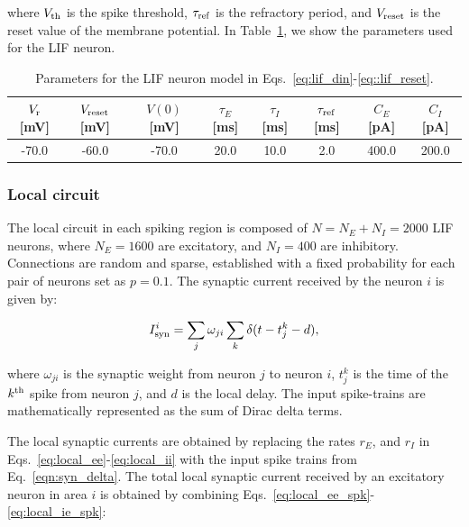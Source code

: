 \noindent  where $V_{\rm th}$ is the spike threshold, $\tau_{\rm ref}$ is the refractory period, and $V_{\rm reset}$ is the reset value of the membrane potential. In Table~\ref{tab:table_lif}, we show the parameters used for the LIF neuron.

\begin{table}[!ht]
\centering
\begin{tabular}{|c|c|c|c|c|c|c|c|}
\hline
$V_{\rm r}$ {[}mV{]} & $V_{\rm reset}$ {[}mV{]} & $V(0)$ {[}mV{]} & $\tau_{E}$ {[}ms{]} & $\tau_{I}$ {[}ms{]} & $\tau_{\rm ref}$ {[}ms{]} & $C_{E}$ {[}pA{]} & $C_{I}$ {[}pA{]} \\ \hline
-70.0                & -60.0                    & -70.0           & 20.0                & 10.0                & 2.0                       & 400.0            & 200.0            \\ \hline
\end{tabular}
\caption{Parameters for the LIF neuron model in Eqs.~\ref{eq:lif_din}-\ref{eq::lif_reset}.}\label{tab:table_lif}
\end{table}



\subsubsection{Local circuit}\label{local_circuit_spk} The local circuit in each spiking region is composed of $N=N_E+N_I=2000$ LIF neurons, where $N_E = 1600$ are excitatory, and $N_I = 400$ are inhibitory. Connections are random and sparse, established with a fixed probability for each pair of neurons set as $p=0.1$. The synaptic current received by the neuron $i$ is given by:

\begin{equation}
I_{\rm syn}^{i} =  \sum_{j} \omega_{ji}\sum_{k}\delta(t-t_{j}^{k}-d),
\label{eqn:syn_delta}
\end{equation}

\noindent  where $\omega_{ji}$ is the synaptic weight from neuron $j$ to neuron $i$, $t_{j}^{k}$ is the time of the $k^{\rm th}$ spike from neuron $j$, and $d$ is the local delay. The input spike-trains are mathematically represented as the sum of Dirac delta terms. 

The local synaptic currents are obtained by replacing the rates $r_E$, and $r_I$ in Eqs.~\ref{eq:local_ee}-\ref{eq:local_ii} with the input spike trains from Eq.~\ref{eqn:syn_delta}. The total local synaptic current received by an excitatory neuron in area $i$ is obtained by combining Eqs.~\ref{eq:local_ee_spk}-\ref{eq:local_ie_spk}:


